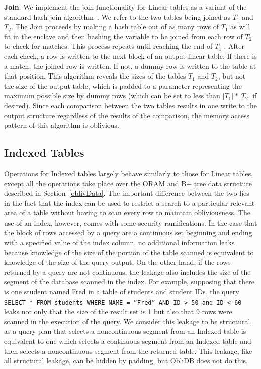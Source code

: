\documentclass[letterpaper,twocolumn,10pt]{article}
\def\name/{ObliDB}
\begin{document}
  \noindent \textbf{Join}. 
We implement the join functionality for Linear tables as a variant of the standard hash join algorithm~\cite{EN10}. We refer to the two tables being joined as $T_1$ and $T_2$. The Join proceeds by making a hash table out of as many rows of $T_1$ as will fit in the enclave and then hashing the variable to be joined from each row of $T_2$ to check for matches. This process repeats until reaching the end of $T_1$ . After each check, a row is written to the next block of an output linear table. If there is a match, the joined row is written. If not, a dummy row is written to the table at that position. This algorithm reveals the sizes of the tables $T_1$ and $T_2$, but not the size of the output table, which is padded to a parameter representing the maximum possible size by dummy rows (which can be set to less than $|T_1|*|T_2|$ if desired). Since each comparison between the two tables results in one write to the output structure regardless of the results of the comparison, the memory access pattern of this algorithm is oblivious. 

\subsection{Indexed Tables}

Operations for Indexed tables largely behave similarly to those for Linear tables, except all the operations take place over the ORAM and B+ tree data structure described in Section~\ref{oblivData}. The important difference between the two lies in the fact that the index can be used to restrict a search to a particular relevant area of a table without having to scan every row to maintain obliviousness. The use of an index, however, comes with some security ramifications. In the case that the block of rows accessed by a query are a continuous set beginning and ending with a specified value of the index column, no additional information leaks because knowledge of the size of the portion of the table scanned is equivalent to knowledge of the size of the query output. On the other hand, if the rows returned by a query are not continuous, the leakage also includes the size of the segment of the database scanned in the index. For example, supposing that there is one student named Fred in a table of students and student IDs,  the query \texttt{SELECT * FROM students WHERE NAME = ``Fred'' AND ID > 50 and ID < 60} leaks not only that the size of the result set is 1 but also that 9 rows were scanned in the execution of the query. We consider this leakage to be structural, as a query plan that selects a noncontinuous segment from an Indexed table is equivalent to one which selects a continuous segment from an Indexed table and then selects a noncontinuous segment from the returned table. This leakage, like all structural leakage, can be hidden by padding, but \name/ does not do this. 
\end{document}
